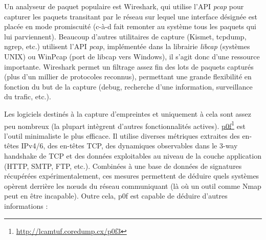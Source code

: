 \documentclass[]{article}
\begin{document}
\par Un analyseur de paquet populaire est Wireshark, qui utilise l'API \textit{pcap} pour capturer les paquets transitant par le réseau sur lequel une interface désignée est placée en mode promiscuité (c-à-d fait remonter au système tous les paquets qui lui parviennent). Beaucoup d'autres utilitaires de capture (Kismet, tcpdump, ngrep, etc.) utilisent l'API \textit{pcap}, implémentée dans la librairie \textit{libcap} (systèmes UNIX) ou WinPcap (port de libcap vers Windows), il s'agit donc d'une ressource importante. Wireshark permet un filtrage assez fin des lots de paquets capturés (plus d'un millier de protocoles reconnus), permettant une grande flexibilité en fonction du but de la capture (debug, recherche d'une information, surveillance du trafic, etc.).\\

\par Les logiciels destinés à la capture d'empreintes et uniquement à cela sont assez peu nombreux (la plupart intègrent d'autres fonctionnalités actives). \href{http://lcamtuf.coredump.cx/p0f3}{p0f}\footnote{\url{http://lcamtuf.coredump.cx/p0f3}} est l'outil minimaliste le plus efficace. Il utilise diverses métriques extraites des en-têtes IPv4/6, des en-têtes TCP, des dynamiques observables dans le 3-way handshake de TCP et des données exploitables au niveau de la couche application (HTTP, SMTP, FTP, etc.). Combinées à une base de données de signatures récupérées expérimentalement, ces mesures permettent de déduire quels systèmes opèrent derrière les nœuds du réseau communiquant (là où un outil comme Nmap peut en être incapable). Outre cela, p0f est capable de déduire d'autres informations :
\end{document}
